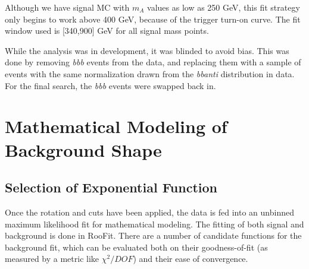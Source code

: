 Although we have signal MC with $m_A$ values as low as 250 GeV, this fit strategy only
begins to work above 400 GeV, because of the trigger turn-on curve.  The fit window
used is [340,900] GeV for all signal mass points.

While the analysis was in development, it was blinded to avoid bias.  This was done 
by removing \textit{bbb} events from the data, and replacing them with a sample of
events with the same normalization drawn from the \textit{bbanti} distribution
in data.  For the final search, the \textit{bbb} events were swapped back in.








\section{Mathematical Modeling of Background Shape}
\subsection{Selection of Exponential Function}
Once the rotation and cuts have been applied, the data is fed into an 
unbinned maximum likelihood fit for mathematical modeling.  The fitting
of both signal and background is done in RooFit.  There are a number 
of candidate functions for the background fit, which can be evaluated
both on their goodness-of-fit (as measured by a metric like $\chi^2/DOF$)
and their ease of convergence.

